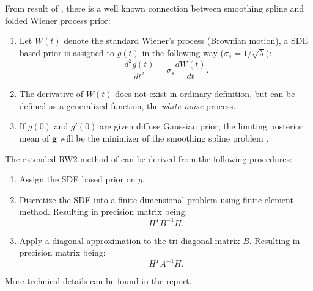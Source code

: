 \documentclass{beamer} %
\begin{document}
\begin{frame}

From result of \cite{wahba}, there is a well known connection between smoothing spline and folded Wiener process prior:

\begin{enumerate}
\pause

\item Let $W(t)$ denote the standard Wiener's process (Brownian motion), a SDE based prior is assigned to $g(t)$ in the following way ($\sigma_s = 1/\sqrt{\lambda}$):
$$\frac{d^2g(t)}{dt^2} = \sigma_s\frac{dW(t)}{dt}.$$ 
\pause


\item The derivative of $W(t)$ does not exist in ordinary definition, but can be defined as a generalized function, the \textit{white noise} process. 

\pause


\item If $g(0)$ and $g'(0)$ are given diffuse Gaussian prior, the limiting posterior mean of $\boldsymbol g$ will be the minimizer of the smoothing spline problem \citep{wahba}.

\end{enumerate}
\end{frame}


\begin{frame}
The extended RW2 method of \cite{rw2} can be derived from the following procedures:
\begin{enumerate}
\pause
\item Assign the SDE based prior on $g$.
\pause
\item Discretize the SDE into a finite dimensional problem using finite element method. Resulting in precision matrix being: $$H^T B^{-1} H.$$
\pause
\item Apply a diagonal approximation to the tri-diagonal matrix $B$. Resulting in precision matrix being: $$H^T A^{-1} H.$$
\end{enumerate}


\pause

More technical details can be found in the report.

\end{frame}
\end{document}
